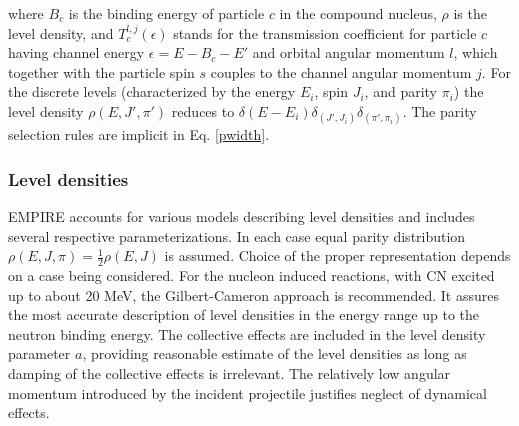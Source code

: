 \documentclass[twocolumn,amsmath,amssymb,10pt,groupedaddress,a4paper]{revtex4}
\begin{document}
\noindent where $B_{c}$ is the binding energy of particle $c$ in
the compound nucleus, $\rho$ is the level density,
and $T_{c}^{l,j}(\epsilon)$ stands for the transmission coefficient
for particle $c$ having channel energy $\epsilon=E-B_{c}-E'$ and
orbital angular momentum $l$, which together with the particle spin
$s$ couples to the channel angular momentum $j$. For the discrete
levels (characterized by the energy $E_{i}$, spin $J_{i}$, and parity
$\pi_{i}$) the level density $\rho(E,J',\pi')$ reduces to $\delta(E-E_{i})\delta_{(J',J_{i})}\delta_{(\pi',\pi_{i})}$.
The parity selection rules are implicit in
Eq. \ref{pwidth}.

\subsubsection{Level densities}
EMPIRE accounts for various models describing level densities
and includes several respective parameterizations. In each case equal
parity distribution $\rho(E,J,\pi)=\frac{1}{2}\rho(E,J)$ is assumed.
Choice of the proper representation depends on a case being considered.
For the nucleon induced reactions, with CN excited up to about 20
MeV, the Gilbert-Cameron approach is recommended. It assures the most
accurate description of level densities in the energy range up to
the neutron binding energy. The collective effects are included in
the level density parameter $a$, providing reasonable estimate of
the level densities as long as damping of the collective effects is
irrelevant. The relatively low angular momentum introduced by the
incident projectile justifies neglect of dynamical effects.
\end{document}
